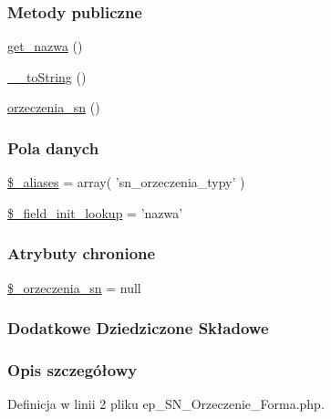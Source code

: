 \subsubsection*{Metody publiczne}
\begin{DoxyCompactItemize}
\item 
\hyperlink{classep___s_n___orzeczenie___forma_ac0818f0049d7b84f08f77128f54cee36}{get\-\_\-nazwa} ()
\item 
\hyperlink{classep___s_n___orzeczenie___forma_a7516ca30af0db3cdbf9a7739b48ce91d}{\-\_\-\-\_\-to\-String} ()
\item 
\hyperlink{classep___s_n___orzeczenie___forma_a1da449088f8d852fb2a7a425e8036b13}{orzeczenia\-\_\-sn} ()
\end{DoxyCompactItemize}
\subsubsection*{Pola danych}
\begin{DoxyCompactItemize}
\item 
\hyperlink{classep___s_n___orzeczenie___forma_ab4e31d75f0bc5d512456911e5d01366b}{\$\-\_\-aliases} = array( 'sn\-\_\-orzeczenia\-\_\-typy' )
\item 
\hyperlink{classep___s_n___orzeczenie___forma_a4a4d54ae35428077a7c61ec8a5139af3}{\$\-\_\-field\-\_\-init\-\_\-lookup} = 'nazwa'
\end{DoxyCompactItemize}
\subsubsection*{Atrybuty chronione}
\begin{DoxyCompactItemize}
\item 
\hyperlink{classep___s_n___orzeczenie___forma_a6f02468de85c0d4fa4f284d88f064662}{\$\-\_\-orzeczenia\-\_\-sn} = null
\end{DoxyCompactItemize}
\subsubsection*{Dodatkowe Dziedziczone Składowe}


\subsubsection{Opis szczegółowy}


Definicja w linii 2 pliku ep\-\_\-\-S\-N\-\_\-\-Orzeczenie\-\_\-\-Forma.\-php.



